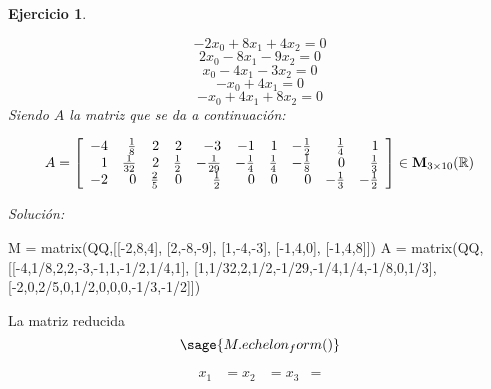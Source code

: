 \documentclass[12pt]{amsart}
\newtheorem{ejer}{Ejercicio}
\begin{document}
\begin{ejer}
\begin{minipage}{\textwidth}
\begin{tcolorbox}[colback = red!20!white,title=Versión Ecuaciones Implícitas]
\[ -2 x_{0} + 8 x_{1} + 4 x_{2} = 0 \]
\[ 2 x_{0} - 8 x_{1} - 9 x_{2} = 0 \]
\[ x_{0} - 4 x_{1} - 3 x_{2} = 0 \]
\[ -x_{0} + 4 x_{1} = 0 \]
\[ -x_{0} + 4 x_{1} + 8 x_{2} = 0 \]
Siendo $A$ la matriz que se da a continuación:
\end{tcolorbox}
\end{minipage}
\[ A = \left[\begin{array}{rrrrrrrrrr}
-4 & \frac{1}{8} & 2 & 2 & -3 & -1 & 1 & -\frac{1}{2} & \frac{1}{4} & 1 \\
1 & \frac{1}{32} & 2 & \frac{1}{2} & -\frac{1}{29} & -\frac{1}{4} & \frac{1}{4} & -\frac{1}{8} & 0 & \frac{1}{3} \\
-2 & 0 & \frac{2}{5} & 0 & \frac{1}{2} & 0 & 0 & 0 & -\frac{1}{3} & -\frac{1}{2}
\end{array}\right] \in {\bf M}_{3\times 10}({\mathbb R})\]
\end{ejer}

{\it Soluci\'on:}

\begin{sageblock}
M = matrix(QQ,[[-2,8,4],
[2,-8,-9],
[1,-4,-3],
[-1,4,0],
[-1,4,8]])
A = matrix(QQ,[[-4,1/8,2,2,-3,-1,1,-1/2,1/4,1],
[1,1/32,2,1/2,-1/29,-1/4,1/4,-1/8,0,1/3],
[-2,0,2/5,0,1/2,0,0,0,-1/3,-1/2]])
\end{sageblock}

La matriz reducida
$$
	\sage{M.echelon_form()}
$$

\begin{align*}
	x_1 &= 
	x_2 &= 
	x_3 &= 
\end{align*}

\end{document}
